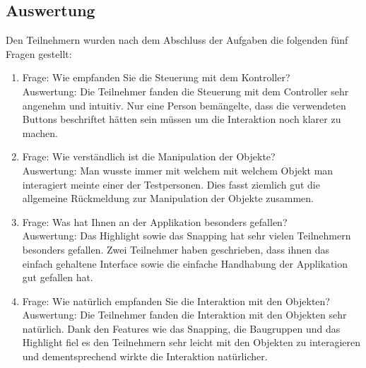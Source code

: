 \subsection{Auswertung}
Den Teilnehmern wurden nach dem Abschluss der Aufgaben die folgenden fünf Fragen gestellt:

\begin{enumerate} [itemsep=2pt]
	\item Frage: Wie empfanden Sie die Steuerung mit dem Kontroller? \\
	Auswertung: Die Teilnehmer fanden die Steuerung mit dem Controller sehr angenehm und intuitiv. Nur eine Person bemängelte, dass die verwendeten Buttons beschriftet hätten sein müssen um die Interaktion noch klarer zu machen.
	
	\item Frage: Wie verständlich ist die Manipulation der Objekte? \\
	Auswertung: \grqq Man wusste immer mit welchem mit welchem Objekt man interagiert\grqq {} meinte einer der Testpersonen. Dies fasst ziemlich gut die allgemeine Rückmeldung zur Manipulation der Objekte zusammen.
	
	\item Frage: Was hat Ihnen an der Applikation besonders gefallen? \\
	Auswertung: Das Highlight sowie das Snapping hat sehr vielen Teilnehmern besonders gefallen. Zwei Teilnehmer haben geschrieben, dass ihnen das einfach gehaltene Interface sowie die einfache Handhabung der Applikation gut gefallen hat.
	
	\item Frage: Wie natürlich empfanden Sie die Interaktion mit den Objekten? \\
	Auswertung: Die Teilnehmer fanden die Interaktion mit den Objekten sehr natürlich. Dank den Features wie das Snapping, die Baugruppen und das Highlight fiel es den Teilnehmern sehr leicht mit den Objekten zu interagieren und dementsprechend wirkte die Interaktion natürlicher.
	

\end{enumerate}
